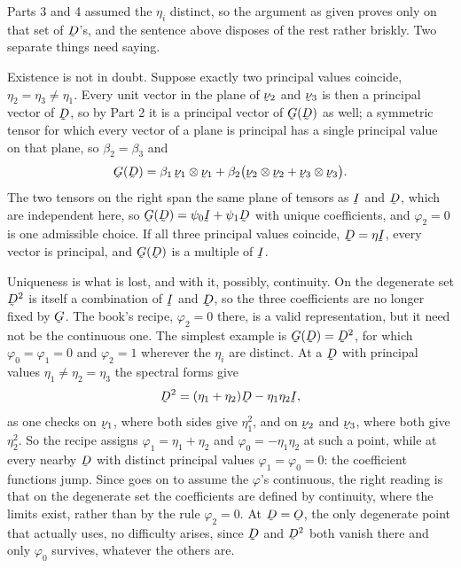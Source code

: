 \begin{remark}
\label{rem:ch9degen}
Parts 3 and 4 assumed the $\eta_{i}$ distinct, so the argument as given
proves  only on that set of $\bD$'s, and the sentence above
disposes of the rest rather briskly. Two separate things need saying.

Existence is not in doubt. Suppose exactly two principal values
coincide, $\eta_{2}=\eta_{3}\neq\eta_{1}$. Every unit vector in the
plane of $\bnu_{2}$ and $\bnu_{3}$ is then a principal vector of $\bD$,
so by Part 2 it is a principal vector of $\bG(\bD)$ as well; a symmetric
tensor for which every vector of a plane is principal has a single
principal value on that plane, so $\beta_{2}=\beta_{3}$ and
\[
   \bG(\bD)=\beta_{1}\,\bnu_{1}\otimes\bnu_{1}
   +\beta_{2}\big(\bnu_{2}\otimes\bnu_{2}+\bnu_{3}\otimes\bnu_{3}\big).
\]
The two tensors on the right span the same plane of tensors as $\I$ and
$\bD$, which are independent here, so $\bG(\bD)=\psi_{0}\I+\psi_{1}\bD$
with unique coefficients, and $\varphi_{2}=0$ is one admissible choice.
If all three principal values coincide, $\bD=\eta\I$, every vector is
principal, and $\bG(\bD)$ is a multiple of $\I$.

Uniqueness is what is lost, and with it, possibly, continuity. On the
degenerate set $\bD^{2}$ is itself a combination of $\I$ and $\bD$, so the
three coefficients are no longer fixed by $\bG$. The book's recipe,
$\varphi_{2}=0$ there, is a valid representation, but it need not be the
continuous one. The simplest example is $\bG(\bD)=\bD^{2}$, for which
$\varphi_{0}=\varphi_{1}=0$ and $\varphi_{2}=1$ wherever the $\eta_{i}$
are distinct. At a $\bD$ with principal values
$\eta_{1}\neq\eta_{2}=\eta_{3}$ the spectral forms give
\[
   \bD^{2}=(\eta_{1}+\eta_{2})\bD-\eta_{1}\eta_{2}\I ,
\]
as one checks on $\bnu_{1}$, where both sides give $\eta_{1}^{2}$, and on
$\bnu_{2}$ and $\bnu_{3}$, where both give $\eta_{2}^{2}$. So the recipe
assigns $\varphi_{1}=\eta_{1}+\eta_{2}$ and $\varphi_{0}=-\eta_{1}\eta_{2}$
at such a point, while at every nearby $\bD$ with distinct principal
values $\varphi_{1}=\varphi_{0}=0$: the coefficient functions jump. Since
 goes on to assume the $\varphi$'s continuous, the right reading
is that on the degenerate set the coefficients are defined by continuity,
where the limits exist, rather than by the rule $\varphi_{2}=0$. At
$\bD=\Ob$, the only degenerate point that  actually uses, no
difficulty arises, since $\bD$ and $\bD^{2}$ both vanish there and only
$\varphi_{0}$ survives, whatever the others are.
\end{remark}


